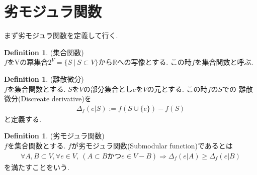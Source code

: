 \documentclass[11pt, a4paper, dvipdfmx]{jsarticle}
\theoremstyle{definition}
\newtheorem{Definition+}[Axiom+]{Definition}
\newcommand{\R}{\mathbb{R}}
\begin{document}
\section{劣モジュラ関数}
まず劣モジュラ関数を定義して行く.
\begin{Definition+}(集合関数)\\
   $f$をVの冪集合$2^{V} = \{S~|~S\subset V\}$から$\R$への写像とする. この時$f$を集合関数と呼ぶ.
\end{Definition+}
\begin{Definition+}(離散微分)\\
    $f$を集合関数とする. $S$を$V$の部分集合とし$e$を$V$の元とする. この時$f$の$S$での
    離散微分(Discreate derivative)を
    \begin{align*}
        \Delta_{f}(e | S) := f(S\cup\{e\}) - f(S)
    \end{align*}
    と定義する.
\end{Definition+}
\begin{Definition+}(劣モジュラ関数)\\
    $f$を集合関数とする. $f$が劣モジュラ関数(Submodular function)であるとは
    \begin{align*}
        \forall A, B\subset V, \forall e\in V, ~(A\subset B かつe\in V - B)\Longrightarrow \Delta_{f}(e | A)\geq\Delta_{f}(e | B)
    \end{align*}
    を満たすことをいう.
\end{Definition+}
\end{document}
